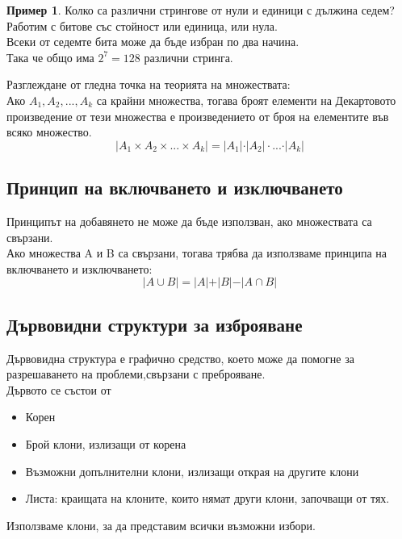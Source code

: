 \documentclass[fleqn, 12pt]{article}
\theoremstyle{definition}
\newtheorem{example}{Пример}[subsection]
\begin{document}
\begin{example}
Колко са различни стрингове от нули и единици с дължина седем? \\
Работим с битове със стойност  или единица, или нула.\\
Всеки от седемте бита може да бъде избран по два начина.\\
Така че общо има $2^7= 128$ различни стринга.
\end{example}

Разглеждане от гледна точка на теорията на множествата: \\
Ако $A_1, A_2, ..., A_k$ са крайни множества, тогава броят елементи на Декартовото произведение от тези множества е произведението от броя на елементите във всяко множество.
$$\vert A_1 \times A_2 \times ... \times A_k \vert = \vert A_1 \vert \cdot  \vert A_2 \vert \cdot  ... \cdot \vert A_k \vert $$

\subsection{Принцип на включването и изключването}
Принципът на добавянето не може да бъде използван, ако множествата са свързани.\\
Ако множества A и B са свързани, тогава трябва да използваме принципа на включването и изключването:
$$\vert A \cup B \vert = \vert A \vert + \vert B \vert - \vert A \cap B \vert$$

\subsection{Дървовидни структури за изброяване}
Дървовидна структура е графично средство, което може да помогне за разрешаването на проблеми,свързани с преброяване. \\
Дървото се състои от 
\begin{itemize}
\item Корен
\item Брой клони, излизащи от корена
\item Възможни допълнителни клони, излизащи открая на другите клони
\item Листа: краищата на клоните, които нямат други клони, започващи от тях.
\end{itemize}
Използваме клони, за да представим всички възможни избори.
\end{document}
